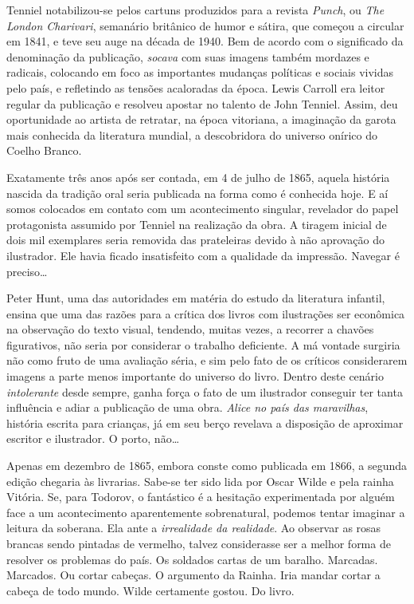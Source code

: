 Tenniel notabilizou-se pelos cartuns produzidos para a revista
\emph{Punch}, ou \emph{The London Charivari}, semanário britânico de
humor e sátira, que começou a circular em 1841, e teve seu auge na
década de 1940. Bem de acordo com o significado da denominação da
publicação, \textit{socava} com suas imagens também mordazes e radicais,
colocando em foco as importantes mudanças políticas e sociais vividas
pelo país, e refletindo as tensões acaloradas da época. Lewis Carroll
era leitor regular da publicação e resolveu apostar no talento de John
Tenniel. Assim, deu oportunidade ao artista de retratar, na época
vitoriana, a imaginação da garota mais conhecida da literatura mundial,
a descobridora do universo onírico do Coelho Branco.

Exatamente três anos após ser contada, em 4 de julho de 1865, aquela
história nascida da tradição oral seria publicada na forma como é
conhecida hoje. E aí somos colocados em contato com um acontecimento
singular, revelador do papel protagonista assumido por Tenniel na
realização da obra. A tiragem inicial de dois mil exemplares seria
removida das prateleiras devido à não aprovação do ilustrador. Ele havia
ficado insatisfeito com a qualidade da impressão. Navegar é preciso\ldots{}

Peter Hunt, uma das autoridades em matéria do estudo da literatura
infantil, ensina que uma das razões para a crítica dos livros com
ilustrações ser econômica na observação do texto visual, tendendo,
muitas vezes, a recorrer a chavões figurativos, não seria por considerar
o trabalho deficiente. A má vontade surgiria não como fruto de uma
avaliação séria, e sim pelo fato de os críticos considerarem imagens a
parte menos importante do universo do livro. Dentro deste cenário
\textit{intolerante} desde sempre, ganha força o fato de um ilustrador
conseguir ter tanta influência e adiar a publicação de uma obra.
\emph{Alice no país das maravilhas}, história escrita para crianças, já
em seu berço revelava a disposição de aproximar escritor e ilustrador. O
porto, não\ldots{}

Apenas em dezembro de 1865, embora conste como publicada em 1866, a
segunda edição chegaria às livrarias. Sabe-se ter sido lida por Oscar
Wilde e pela rainha Vitória. Se, para Todorov, o fantástico é a
hesitação experimentada por alguém face a um acontecimento aparentemente
sobrenatural, podemos tentar imaginar a leitura da soberana. Ela ante a
\textit{irrealidade da realidade}. Ao observar as rosas brancas sendo pintadas
de vermelho, talvez considerasse ser a melhor forma de resolver os
problemas do país. Os soldados cartas de um baralho. Marcadas. Marcados.
Ou cortar cabeças. O argumento da Rainha. Iria mandar cortar a cabeça de
todo mundo. Wilde certamente gostou. Do livro.

